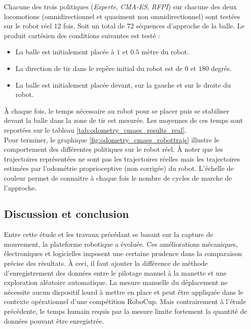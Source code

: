 Chacune des trois politiques (\textit{Experte}, \textit{CMA-ES}, \textit{RFPI})
sur chacune des deux locomotions (omnidirectionnel et quasiment non omnidirectionnel) sont
testées sur le robot réel $12$ fois.
Soit un total de $72$ séquences d'approche de la balle.
Le produit cartésien des conditions suivantes est testé :
\begin{itemize}
    \item La balle est initialement placée à $1$ et $0.5$ mètre du robot. 
    \item La direction de tir dans le repère initial du robot est de $0$ et $180$ degrés.
    \item La balle est initialement placée devant, sur la gauche et sur le droite du robot.
\end{itemize}

À chaque fois, le temps nécessaire au robot pour se placer puis se stabiliser 
devant la balle dans la zone de tir est mesurée.
Les moyennes de ces temps sont reportées sur le tableau \ref{tab:odometry_cmaes_results_real}.\\

Pour terminer, le graphique \ref{fig:odometry_cmaes_robottrajs} illustre 
le comportement des différentes politiques sur le robot réel.
À noter que les trajectoires représentées ne sont pas les trajectoires réelles 
mais les trajectoires estimées par l'odométrie proprioceptive (non corrigée) du robot.
L'échelle de couleur permet de connaitre à chaque fois le nombre de cycles de marche
de l'approche.

\subsection{Discussion et conclusion}

Entre cette étude et les travaux précédant se basant sur 
la capture de mouvement, la plateforme robotique a évoluée.
Ces améliorations mécaniques, électroniques et logicielles imposent 
une certaine prudence dans la comparaison précise des résultats.
À ceci, il faut ajouter la différence de méthode d'enregistrement 
des données entre le pilotage manuel à la manette et une exploration 
aléatoire automatique.
La mesure manuelle du déplacement ne nécessite aucun dispositif
lourd à mettre en place et peut être appliquée dans le contexte
opérationnel d'une compétition RoboCup.
Mais contrairement à l'étude précédente, le temps humain
requis par la mesure limite fortement la quantité de données
pouvant être enregistrée.

